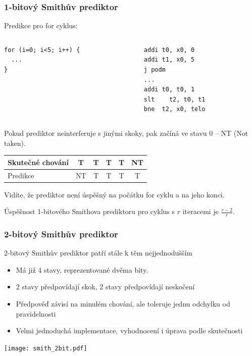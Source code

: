 \documentclass{beamer}
\begin{document}
\begin{frame}[fragile]
\frametitle{1-bitový Smithův prediktor}

Predikce pro for cyklus:

\begin{columns}[T]
\begin{column}{0.4\textwidth}
\begin{verbatim}
for (i=0; i<5; i++) {
  ...
}
\end{verbatim}
\end{column}
\hfill
\begin{column}{0.4\textwidth}
\begin{verbatim}
addi t0, x0, 0
addi t1, x0, 5
j podm
...
addi t0, t0, 1
slt    t2, t0, t1
bne  t2, x0, telo
\end{verbatim}
\end{column}
\end{columns}
\bigskip
Pokud prediktor neinterferuje s jinými skoky, pak začíná ve stavu 0 -- NT (Not taken).

\begin{tabular}{|l|c|c|c|c|c|}\hline
Skutečné chování & T & T & T & T & NT\\ \hline
Predikce         & {\color{red}NT} & T & T & T & {\color{red}T}\\ \hline
\end{tabular}

Vidíte, že prediktor není úspěšný na počátku for cyklu a na jeho konci.

Úspěšnost 1-bitového Smithova prediktoru pro cyklus s $r$ iteracemi je $\frac{r-2}{r}$.
\end{frame}


\begin{frame}
\frametitle{2-bitový Smithův prediktor}

2-bitový Smithův prediktor patří stále k těm nejjednodušším
\begin{itemize}
\item Má již 4 stavy, reprezentované dvěma bity.
\item 2 stavy předpovídají skok, 2 stavy předpovídají neskočení
\item Předpověď závisí na minulém chování, ale toleruje jednu odchylku od pravidelnosti
\item Velmi jednoduchá implementace, vyhodnocení i úprava podle skutečnosti
\end{itemize}

\begin{center}
\texttt{[image: smith\_2bit.pdf]}
\end{center}
\end{frame}
\end{document}
